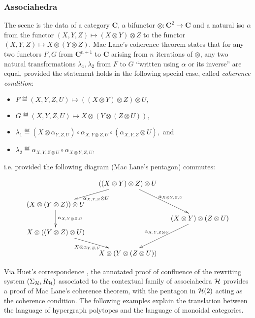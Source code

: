 \subsubsection{Associahedra}
The scene is the data of a category $\mathbf C$, a bifunctor $\otimes:\mathbf{C}^2\rightarrow \mathbf C$ and a natural iso $\alpha$ from the functor
$(X,Y,Z)\mapsto (X\otimes Y)\otimes Z$ to the functor  $(X,Y,Z)\mapsto X \otimes (Y\otimes Z)$. 
Mac Lane's coherence theorem states that for any two functors $F,G$ from $\mathbf{C}^{n+1}$ to $\mathbf{C}$ arising from $n$ iterations of $\otimes$, any two  natural transformations $\lambda_1,\lambda_2$ from $F$ to $G$  ``written using $\alpha$ or its inverse'' are equal, provided the statement holds in the following special case, called  {\em coherence condition}: 
\begin{itemize}
\item $F\eqdef (X,Y,Z,U)\mapsto ((X\otimes Y)\otimes Z)\otimes U,$ 
\item $G\eqdef (X,Y,Z,U)\mapsto X\otimes (Y\otimes (Z\otimes U)),$ 
\item $\lambda_1\eqdef (X\otimes\alpha_{Y,Z,U})\circ\alpha_{X,Y\otimes Z,U} \circ (\alpha_{X,Y,Z}\otimes U),$ and
\item $\lambda_2\eqdef  \alpha_{X,Y,Z\otimes U}\circ \alpha_{X\otimes Y,Z,U},$ 
\end{itemize}
i.e. provided the following diagram (Mac Lane's pentagon) commutes:
\begin{center}
\vspace{-.5cm}
$$
 \xymatrix @-1.65pc {&& ((X\otimes Y)\otimes Z)\otimes U \ar @{->}[ddll]^{\alpha_{X,Y,Z}\otimes U} \ar @{->}[dddrr]^{\alpha_{X\otimes Y,Z,U}}&& \\
 &&&&\\
 (X\otimes (Y\otimes Z))\otimes U  \ar @{->}[dd]^{\alpha_{X,Y\otimes Z,U} }&&   && \\
 &&&&(X\otimes Y)\otimes (Z\otimes U) \ar @{->}[dddll]_{\alpha_{X,Y,Z\otimes U}}\\
 X\otimes ((Y\otimes Z)\otimes U) \ar @{->}[ddrr]_{X\otimes\alpha_{Y,Z,U}} &  &\\
 &&&&\\
 &&X\otimes (Y\otimes (Z\otimes U))&&}
$$
\end{center}

Via Huet's correspondence \cite{Huet-notes-cat}, the annotated proof of confluence of the rewriting system $(\Sigma_{\mathcal{H}}, R_{\mathcal{H}})$ associated to the contextual family of associahedra $\mathcal{H}$ provides a proof of Mac Lane's coherence theorem, with the pentagon in $\mathcal{H}(2)$ acting as the coherence condition. 
The following examples explain the translation between the language of hypergraph polytopes and the language of monoidal categories. 

